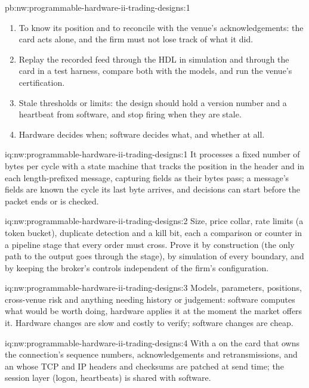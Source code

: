 \begin{solution}{pb:nw:programmable-hardware-ii-trading-designs:1}
\begin{enumerate}
\item To know its position and to reconcile with the venue's acknowledgements: the card acts alone, and the firm must not lose track of
  what it did.
\item Replay the recorded feed through the HDL in simulation and through the card in a test harness, compare both with the models, and run
  the venue's certification.
\item Stale thresholds or limits: the design should hold a version number and a heartbeat from software, and stop firing when they are
  stale.
\item Hardware decides when; software decides what, and whether at all.
\end{enumerate}
\end{solution}

\begin{solution}{iq:nw:programmable-hardware-ii-trading-designs:1}
It processes a fixed number of bytes per cycle with a state machine that tracks the position in the header and in each length-prefixed
message, capturing fields as their bytes pass; a message's fields are known the cycle its last byte arrives, and decisions can start
before the packet ends or is checked.
\end{solution}

\begin{solution}{iq:nw:programmable-hardware-ii-trading-designs:2}
Size, price collar, rate limits (a token bucket), duplicate detection and a kill bit, each a comparison or counter in a pipeline stage that
every order must cross. Prove it by construction (the only path to the output goes through the stage), by simulation of every boundary, and
by keeping the broker's controls independent of the firm's configuration.
\end{solution}

\begin{solution}{iq:nw:programmable-hardware-ii-trading-designs:3}
Models, parameters, positions, cross-venue risk and anything needing history or judgement: software computes what would be worth doing,
hardware applies it at the moment the market offers it. Hardware changes are slow and costly to verify; software changes are cheap.
\end{solution}

\begin{solution}{iq:nw:programmable-hardware-ii-trading-designs:4}
With a  on the card that owns the connection's sequence numbers, acknowledgements and retransmissions, and an  whose TCP and IP headers and checksums are patched at send time; the session layer (logon, heartbeats) is shared with software.
\end{solution}

